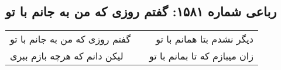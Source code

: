 \begin{center}
\section*{رباعی شماره ۱۵۸۱: گفتم روزی که من به جانم با تو}
\label{sec:1581}
\begin{longtable}{l p{0.5cm} r}
گفتم روزی که من به جانم با تو
&&
دیگر نشدم بتا همانم با تو
\\
لیکن دانم که هرچه بازم ببری
&&
زان میبازم که تا بمانم با تو
\\
\end{longtable}
\end{center}
